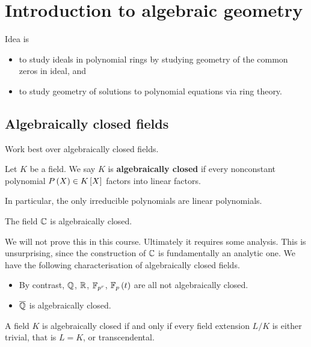 \section{Introduction to algebraic geometry}

Idea is
\begin{itemize}
\item to study ideals in polynomial rings by studying geometry of the common zeros in ideal, and
\item to study geometry of solutions to polynomial equations via ring theory.
\end{itemize}

\subsection{Algebraically closed fields}

Work best over algebraically closed fields.

\begin{definition}
Let $ K $ be a field. We say $ K $ is \textbf{algebraically closed} if every nonconstant polynomial $ P\left( X \right) \in K\left[ X \right] $ factors into linear factors.
\end{definition}

In particular, the only irreducible polynomials are linear polynomials.

\begin{theorem}
The field $ \mathbb{C} $ is algebraically closed.
\end{theorem}

We will not prove this in this course. Ultimately it requires some analysis. This is unsurprising, since the construction of $ \mathbb{C} $ is fundamentally an analytic one. We have the following characterisation of algebraically closed fields.

\begin{example2}
\hfill
\begin{itemize}
\item By contrast, $ \mathbb{Q} $, $ \mathbb{R} $, $ \mathbb{F}_{p^r} $, $ \mathbb{F}_p\left( t \right) $ are all not algebraically closed.
\item $ \overline{\mathbb{Q}} $ is algebraically closed.
\end{itemize}
\end{example2}

\begin{lemma}
A field $ K $ is algebraically closed if and only if every field extension $ L / K $ is either trivial, that is $ L = K $, or transcendental.
\end{lemma}

